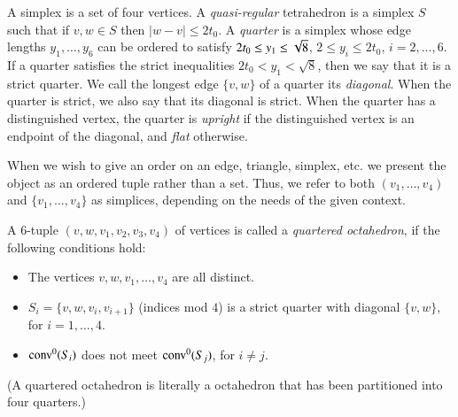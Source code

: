 \begin{definition}
A  simplex is a set of four
vertices.
A {\it quasi-regular\/} tetrahedron is a simplex $S$ such that if
$v,w\in S$ then $|w-v|\le 2t_0$. A {\it quarter\/} is a simplex
whose edge lengths $y_1,\ldots,y_6$ can be ordered to satisfy
$2t_0\le y_1\le\sqrt8$, $2\le y_i\le 2t_0$, $i=2,\ldots,6$. If a
quarter satisfies the strict inequalities $2t_0< y_1< \sqrt8$,
then we say that it is a strict quarter. We call the longest edge
$\{v,w\}$ of a quarter its {\it {} diagonal\/}. When
the quarter is strict, we also say that its diagonal is strict.
When the quarter has a distinguished vertex, the quarter is {\it
upright\/} if the distinguished vertex is an endpoint of the
diagonal, and {\it flat\/} otherwise.
\end{definition}
 
 
 



When we wish to give an order on an edge, triangle, simplex, etc.
we present the object as an ordered tuple rather than a set. Thus,
we refer to both $(v_1,\ldots,v_4)$ and $\{v_1,\ldots,v_4\}$ as
simplices, depending on the needs of the given context.



\begin{definition}  A $6$-tuple $(v,w,v_1,v_2,v_3,v_4)$ of vertices is
called a {\it quartered  octahedron}, if the
following conditions hold:
    \begin{itemize}
    \item The vertices $v,w,v_1,\ldots,v_4$ are all distinct.
    \item $S_i = \{v,w,v_i,v_{i+1}\}$ (indices mod $4$) is a
    strict quarter with diagonal $\{v,w\}$, for $i=1,\ldots,4$.
    \item ${\operatorname{conv}}^0(S_i)$ does not meet ${\operatorname{conv}}^0(S_j)$, for $i\ne j$.
    \end{itemize}
(A quartered octahedron is literally a octahedron that has been
partitioned into four quarters.)
\end{definition}

